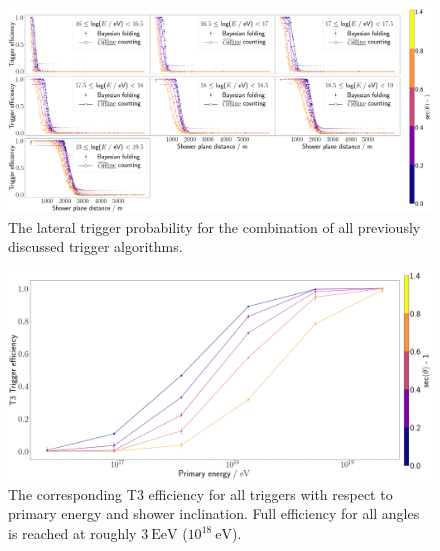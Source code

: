 \begin{figure}
	\centering
	\includegraphics[width=\textwidth]{./plots/all_LTP_comparison.png}
	\caption{The lateral trigger probability for the combination of all previously discussed trigger algorithms.} 
	\label{fig:all-triggers-ltp}
\end{figure}

\begin{figure}
	\centering
	\includegraphics[width=\textwidth]{./plots/classical_t3_efficiency.png}
	\caption{The corresponding T3 efficiency for all triggers with respect to primary energy and shower inclination. Full efficiency for all angles is reached at 
	roughly $\SI{3}{\exa\electronvolt}$ ($10^{18}\SI{}{\electronvolt}$).} 
	\label{fig:t3-efficiency-all-triggers}
\end{figure}

